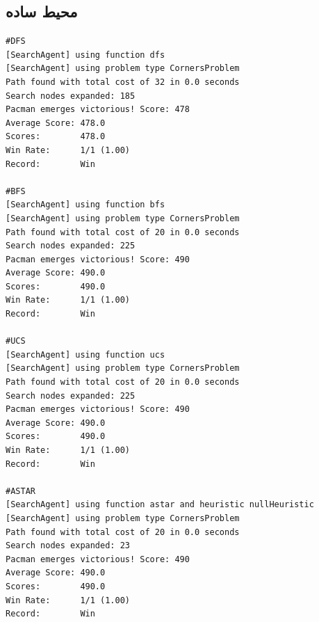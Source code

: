 \documentclass[11pt, a4paper, oneside]{book}
\begin{document}
	 \subsection{محیط ساده}
\begin{LTR}
	\begin{verbatim}
#DFS
[SearchAgent] using function dfs
[SearchAgent] using problem type CornersProblem
Path found with total cost of 32 in 0.0 seconds
Search nodes expanded: 185
Pacman emerges victorious! Score: 478
Average Score: 478.0
Scores:        478.0
Win Rate:      1/1 (1.00)
Record:        Win

#BFS
[SearchAgent] using function bfs
[SearchAgent] using problem type CornersProblem
Path found with total cost of 20 in 0.0 seconds
Search nodes expanded: 225
Pacman emerges victorious! Score: 490
Average Score: 490.0
Scores:        490.0
Win Rate:      1/1 (1.00)
Record:        Win

#UCS
[SearchAgent] using function ucs
[SearchAgent] using problem type CornersProblem
Path found with total cost of 20 in 0.0 seconds
Search nodes expanded: 225
Pacman emerges victorious! Score: 490
Average Score: 490.0
Scores:        490.0
Win Rate:      1/1 (1.00)
Record:        Win

#ASTAR
[SearchAgent] using function astar and heuristic nullHeuristic
[SearchAgent] using problem type CornersProblem
Path found with total cost of 20 in 0.0 seconds
Search nodes expanded: 23
Pacman emerges victorious! Score: 490
Average Score: 490.0
Scores:        490.0
Win Rate:      1/1 (1.00)
Record:        Win
	\end{verbatim}
\end{LTR}
\end{document}
